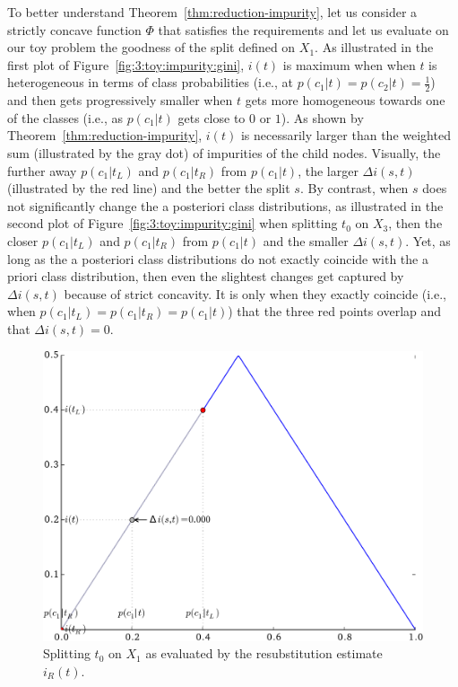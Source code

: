 To better understand Theorem~\ref{thm:reduction-impurity}, let us consider a
strictly concave function $\Phi$ that satisfies the requirements and let us
evaluate on our toy problem the goodness of the split defined on $X_1$.  As
illustrated in the first plot of Figure~\ref{fig:3:toy:impurity:gini},  $i(t)$
is maximum when when $t$ is heterogeneous in terms of class probabilities
(i.e., at $p(c_1|t)=p(c_2|t)=\tfrac{1}{2}$) and then gets progressively smaller
when $t$ gets more homogeneous towards one of the classes (i.e., as $p(c_1|t)$
gets close to $0$ or $1$). As shown by Theorem~\ref{thm:reduction-impurity},
$i(t)$ is necessarily larger than the weighted sum (illustrated by the gray
dot) of impurities of the child nodes. Visually, the further away $p(c_1|t_L)$
and $p(c_1|t_R)$ from $p(c_1|t)$, the larger $\Delta i(s,t)$ (illustrated by
the red line) and the better the split $s$. By contrast, when $s$ does not
significantly change the a posteriori class distributions, as illustrated in
the second plot of Figure~\ref{fig:3:toy:impurity:gini} when splitting $t_0$ on
$X_3$, then the closer $p(c_1|t_L)$ and $p(c_1|t_R)$ from $p(c_1|t)$ and the
smaller $\Delta i(s,t)$. Yet, as long as the a posteriori class distributions
do not exactly coincide with the a priori class distribution, then even the
slightest changes get captured by $\Delta i(s, t)$ because of strict concavity.
It is only when they exactly coincide (i.e., when
$p(c_1|t_L)=p(c_1|t_R)=p(c_1|t)$) that the three red points overlap and that
$\Delta i(s,t)=0$.

\begin{figure}
\centering
\includegraphics[scale=0.7]{figures/ch3_toy_x1_error.pdf}
\caption{Splitting $t_0$ on $X_1$ as evaluated by the resubstitution estimate $i_R(t)$.}
\label{fig:3:toy:impurity:error}
\end{figure}

